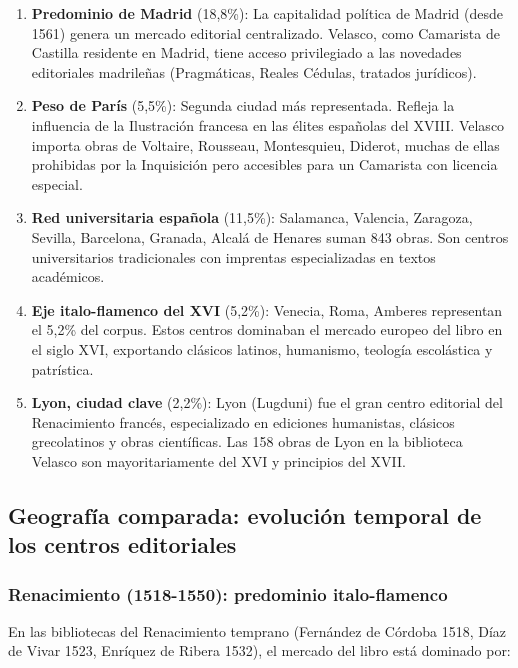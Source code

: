 \documentclass[11pt,a4paper]{article}
\begin{document}
\begin{enumerate}
\item \textbf{Predominio de Madrid} (18,8\%): La capitalidad política de Madrid (desde 1561) genera un mercado editorial centralizado. Velasco, como Camarista de Castilla residente en Madrid, tiene acceso privilegiado a las novedades editoriales madrileñas (Pragmáticas, Reales Cédulas, tratados jurídicos).

\item \textbf{Peso de París} (5,5\%): Segunda ciudad más representada. Refleja la influencia de la Ilustración francesa en las élites españolas del XVIII. Velasco importa obras de Voltaire, Rousseau, Montesquieu, Diderot, muchas de ellas prohibidas por la Inquisición pero accesibles para un Camarista con licencia especial.

\item \textbf{Red universitaria española} (11,5\%): Salamanca, Valencia, Zaragoza, Sevilla, Barcelona, Granada, Alcalá de Henares suman 843 obras. Son centros universitarios tradicionales con imprentas especializadas en textos académicos.

\item \textbf{Eje italo-flamenco del XVI} (5,2\%): Venecia, Roma, Amberes representan el 5,2\% del corpus. Estos centros dominaban el mercado europeo del libro en el siglo XVI, exportando clásicos latinos, humanismo, teología escolástica y patrística.

\item \textbf{Lyon, ciudad clave} (2,2\%): Lyon (Lugduni) fue el gran centro editorial del Renacimiento francés, especializado en ediciones humanistas, clásicos grecolatinos y obras científicas. Las 158 obras de Lyon en la biblioteca Velasco son mayoritariamente del XVI y principios del XVII.
\end{enumerate}

\subsection{Geografía comparada: evolución temporal de los centros editoriales}

\subsubsection{Renacimiento (1518-1550): predominio italo-flamenco}

En las bibliotecas del Renacimiento temprano (Fernández de Córdoba 1518, Díaz de Vivar 1523, Enríquez de Ribera 1532), el mercado del libro está dominado por:
\end{document}
